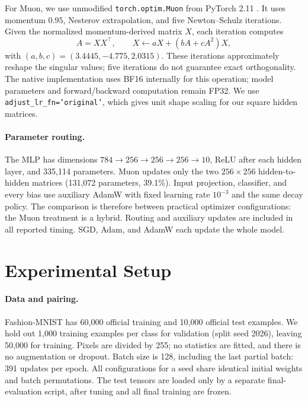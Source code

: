 \documentclass[10pt,a4paper,twocolumn]{article}
\begin{document}
For Muon, we use unmodified \texttt{torch.optim.Muon} from PyTorch 2.11 \cite{pytorch}. It uses momentum $0.95$, Nesterov extrapolation, and five Newton--Schulz iterations. Given the normalized momentum-derived matrix $X$, each iteration computes
\begin{equation}
 A=XX^\top,\qquad X\leftarrow aX+(bA+cA^2)X,
\end{equation}
with $(a,b,c)=(3.4445,-4.775,2.0315)$. These iterations approximately reshape the singular values; five iterations do not guarantee exact orthogonality. The native implementation uses BF16 internally for this operation; model parameters and forward/backward computation remain FP32. We use \texttt{adjust\_lr\_fn='original'}, which gives unit shape scaling for our square hidden matrices.

\paragraph{Parameter routing.}
The MLP has dimensions $784\!\to\!256\!\to\!256\!\to\!256\!\to\!10$, ReLU after each hidden layer, and 335,114 parameters. Muon updates only the two $256\times256$ hidden-to-hidden matrices (131,072 parameters, 39.1\%). Input projection, classifier, and every bias use auxiliary AdamW with fixed learning rate $10^{-3}$ and the same decay policy. The comparison is therefore between practical optimizer configurations: the Muon treatment is a hybrid. Routing and auxiliary updates are included in all reported timing. SGD, Adam, and AdamW each update the whole model.


\section{Experimental Setup}
\paragraph{Data and pairing.}
Fashion-MNIST \cite{fashion} has 60,000 official training and 10,000 official test examples. We hold out 1,000 training examples per class for validation (split seed 2026), leaving 50,000 for training. Pixels are divided by 255; no statistics are fitted, and there is no augmentation or dropout. Batch size is 128, including the last partial batch: 391 updates per epoch. All configurations for a seed share identical initial weights and batch permutations. The test tensors are loaded only by a separate final-evaluation script, after tuning and all final training are frozen.
\end{document}
